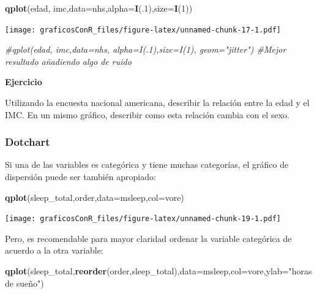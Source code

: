 \documentclass[]{article}
\newenvironment{Shaded}{\begin{snugshade}}{\end{snugshade}}
\newcommand{\CommentTok}[1]{\textcolor[rgb]{0.56,0.35,0.01}{\textit{#1}}}
\newcommand{\DataTypeTok}[1]{\textcolor[rgb]{0.13,0.29,0.53}{#1}}
\newcommand{\DecValTok}[1]{\textcolor[rgb]{0.00,0.00,0.81}{#1}}
\newcommand{\KeywordTok}[1]{\textcolor[rgb]{0.13,0.29,0.53}{\textbf{#1}}}
\newcommand{\NormalTok}[1]{#1}
\newcommand{\StringTok}[1]{\textcolor[rgb]{0.31,0.60,0.02}{#1}}
\newcounter{ejcnt}[section]
\numberwithin{ejcnt}{section}
\newenvironment{ej}[1][]{%
	\refstepcounter{ejcnt}%
	\par\medskip%
	\noindent%
	\textbf{Ejercicio \theejcnt \;\;}%
	\rmfamily%
}{\medskip}
\begin{document}
\begin{Shaded}
\begin{Highlighting}[]
\KeywordTok{qplot}\NormalTok{(edad, imc,}\DataTypeTok{data=}\NormalTok{nhs,}\DataTypeTok{alpha=}\KeywordTok{I}\NormalTok{(.}\DecValTok{1}\NormalTok{),}\DataTypeTok{size=}\KeywordTok{I}\NormalTok{(}\DecValTok{1}\NormalTok{))}
\end{Highlighting}
\end{Shaded}

\texttt{[image: graficosConR\_files/figure-latex/unnamed-chunk-17-1.pdf]}

\begin{Shaded}
\begin{Highlighting}[]
\CommentTok{#qplot(edad, imc,data=nhs, alpha=I(.1),size=I(1), geom="jitter") #Mejor resultado añadiendo algo de ruido}
\end{Highlighting}
\end{Shaded}

\begin{ej}
Utilizando la encuesta nacional americana, describir la relación entre
la edad y el IMC. En un mismo gráfico, describir como esta relación
cambia con el sexo.
\end{ej}

\hypertarget{dotchart}{%
\subsubsection{Dotchart}\label{dotchart}}

Si una de las variables es categórica y tiene muchas categorías, el gráfico de dispersión puede ser también apropiado:

\begin{Shaded}
\begin{Highlighting}[]
\KeywordTok{qplot}\NormalTok{(sleep_total,order,}\DataTypeTok{data=}\NormalTok{msleep,}\DataTypeTok{col=}\NormalTok{vore) }
\end{Highlighting}
\end{Shaded}

\texttt{[image: graficosConR\_files/figure-latex/unnamed-chunk-19-1.pdf]}

Pero, es recomendable para mayor claridad ordenar la variable categórica de acuerdo a la otra variable:

\begin{Shaded}
\begin{Highlighting}[]
\KeywordTok{qplot}\NormalTok{(sleep_total,}\KeywordTok{reorder}\NormalTok{(order,sleep_total),}\DataTypeTok{data=}\NormalTok{msleep,}\DataTypeTok{col=}\NormalTok{vore,}\DataTypeTok{ylab=}\StringTok{"horas de sueño"}\NormalTok{)}
\end{Highlighting}
\end{Shaded}
\end{document}
